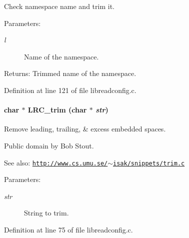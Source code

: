 Check namespace name and trim it. 

\begin{Desc}
\item[Parameters:]
\begin{description}
\item[{\em l}]Name of the namespace.\end{description}
\end{Desc}
\begin{Desc}
\item[Returns:]Trimmed name of the namespace. \end{Desc}


Definition at line 121 of file libreadconfig.c.\hypertarget{group___l_r_c__internals_g01c101649d6e132e1098711f84023ce7}{
\paragraph[{LRC\_\-trim}]{\setlength{\rightskip}{0pt plus 5cm}char $\ast$ LRC\_\-trim (char $\ast$ {\em str})}\hfill}
\label{group___l_r_c__internals_g01c101649d6e132e1098711f84023ce7}


Remove leading, trailing, \& excess embedded spaces. 

Public domain by Bob Stout. \begin{Desc}
\item[See also:]\href{http://www.cs.umu.se/~isak/snippets/trim.c}{\tt http://www.cs.umu.se/$\sim$isak/snippets/trim.c}\end{Desc}
\begin{Desc}
\item[Parameters:]
\begin{description}
\item[{\em str}]String to trim. \end{description}
\end{Desc}


Definition at line 75 of file libreadconfig.c.